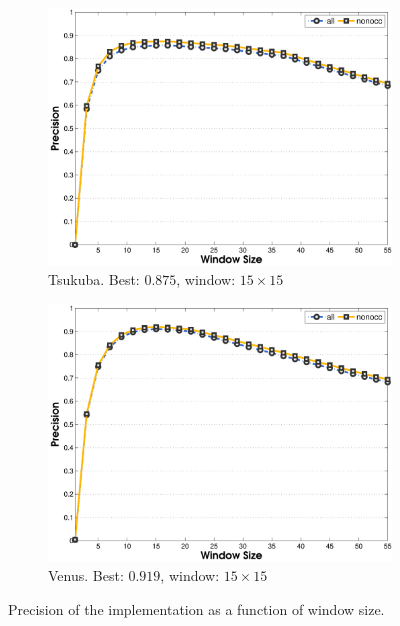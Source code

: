 \documentclass[letterpaper,12pt]{article}
\begin{document}
\begin{figure}[!h]
\begin{subfigure}[b]{0.48\textwidth}
                \label{fig:perf_teddy}
         \end{subfigure}
         \\
        \begin{subfigure}[b]{0.48\textwidth}
                \includegraphics[width=\textwidth]{fig_w_tsukuba.pdf}
                \caption{Tsukuba. Best: $0.875$, window: $15\times15$}
        \end{subfigure}
        \begin{subfigure}[b]{0.48\textwidth}
                \includegraphics[width=\textwidth]{fig_w_venus.pdf}
                \caption{Venus. Best: $0.919$, window: $15\times15$}
        \end{subfigure}
        \caption{Precision of the implementation as a function of window size.}\label{fig:graphs}
\end{figure}
\end{document}
